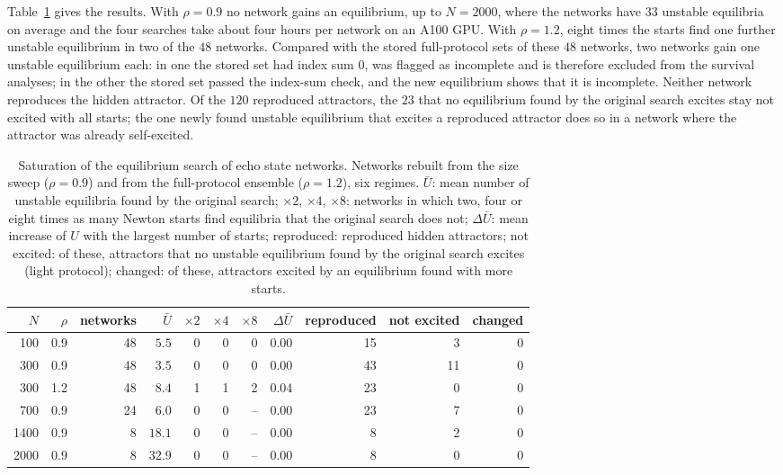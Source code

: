 \documentclass[aip,cha,preprint,amsmath,amssymb,longbibliography]{revtex4-2}
\begin{document}
Table~\ref{tab:sm_sat} gives the results. With $\rho=0.9$ no network gains an equilibrium, up to $N=2000$, where the
networks have $33$ unstable equilibria on average and the four searches take about four hours per network on an A100 GPU.
With $\rho=1.2$, eight times the starts find one further unstable equilibrium in two of the $48$ networks. Compared with the
stored full-protocol sets of these $48$ networks, two networks gain one unstable equilibrium each: in one the stored set
had index sum $0$, was flagged as incomplete and is therefore excluded from the survival analyses; in the other the stored
set passed the index-sum check, and the new equilibrium shows that it is incomplete. Neither network reproduces the hidden
attractor. Of the $120$ reproduced attractors, the $23$ that no equilibrium found by the original search excites stay
not excited with all starts; the one newly found unstable equilibrium that excites a reproduced attractor does so in a
network where the attractor was already self-excited.

\begin{table}
\caption{Saturation of the equilibrium search of echo state networks. Networks rebuilt from the size sweep ($\rho=0.9$) and
from the full-protocol ensemble ($\rho=1.2$), six regimes. $\bar U$: mean number of unstable equilibria found by the original
search; $\times2$, $\times4$, $\times8$: networks in which two, four or eight times as many Newton starts find equilibria
that the original search does not; $\Delta\bar U$: mean increase of $U$ with the largest number of starts; reproduced: reproduced
hidden attractors; not excited: of these, attractors that no unstable equilibrium found by the original search excites
(light protocol); changed: of these, attractors excited by an equilibrium found with more starts.}
\label{tab:sm_sat}
\begin{ruledtabular}
\begin{tabular}{rrrrrrrrrrr}
$N$ & $\rho$ & networks & $\bar U$ & $\times2$ & $\times4$ & $\times8$ & $\Delta\bar U$ & reproduced & not excited & changed \\
\hline
100 & 0.9 & 48 & $5.5$ & 0 & 0 & 0 & $0.00$ & 15 & 3 & 0 \\
300 & 0.9 & 48 & $3.5$ & 0 & 0 & 0 & $0.00$ & 43 & 11 & 0 \\
300 & 1.2 & 48 & $8.4$ & 1 & 1 & 2 & $0.04$ & 23 & 0 & 0 \\
700 & 0.9 & 24 & $6.0$ & 0 & 0 & -- & $0.00$ & 23 & 7 & 0 \\
1400 & 0.9 & 8 & $18.1$ & 0 & 0 & -- & $0.00$ & 8 & 2 & 0 \\
2000 & 0.9 & 8 & $32.9$ & 0 & 0 & -- & $0.00$ & 8 & 0 & 0 \\
\end{tabular}
\end{ruledtabular}
\end{table}
\end{document}
